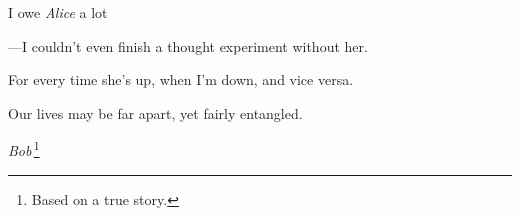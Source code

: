 \cleardoublepage
  \thispagestyle{empty}
  \begin{savenotes}
    \epigraph{
      I owe \emph{Alice} a lot
      
      ---I couldn't even
      finish a thought experiment without her.

      For every time she's up,
      when I'm down,
      and vice versa.

      Our lives may be far apart, yet fairly entangled.
    }{
      \emph{Bob}\,\footnote{ Based on a true story. }
    }
  \end{savenotes}
\clearpage